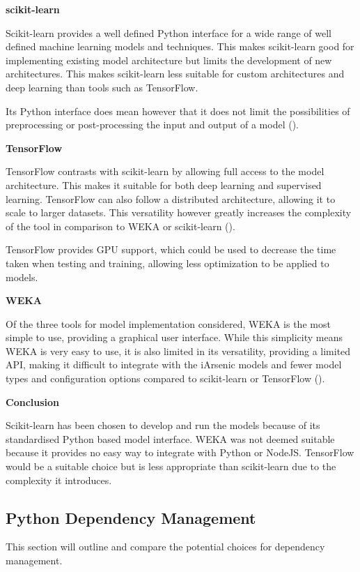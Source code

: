 \textbf{scikit-learn}

Scikit-learn provides a well defined Python interface for a wide range of well defined machine learning models and techniques. This makes scikit-learn good for implementing existing model architecture but limits the development of new architectures. This makes scikit-learn less suitable for custom architectures and deep learning than tools such as TensorFlow. 

Its Python interface does mean however that it does not limit the possibilities of preprocessing or post-processing the input and output of a model (\cite{scikit-learn2023}).

\textbf{TensorFlow}

TensorFlow contrasts with scikit-learn by allowing full access to the model architecture. This makes it suitable for both deep learning and supervised learning. TensorFlow can also follow a distributed architecture, allowing it to scale to larger datasets. This versatility however greatly increases the complexity of the tool in comparison to WEKA or scikit-learn (\cite{Google2023}).

TensorFlow provides GPU support, which could be used to decrease the time taken when testing and training, allowing less optimization to be applied to models.

\textbf{WEKA}

Of the three tools for model implementation considered, WEKA is the most simple to use, providing a graphical user interface. While this simplicity means WEKA is very easy to use, it is also limited in its versatility, providing a limited API, making it difficult to integrate with the iArsenic models and fewer model types and configuration options compared to scikit-learn or TensorFlow (\cite{Waikato2023}).

\textbf{Conclusion}

Scikit-learn has been chosen to develop and run the models because of its standardised Python based model interface. WEKA was not deemed suitable because it provides no easy way to integrate with Python or NodeJS. TensorFlow would be a suitable choice but is less appropriate than scikit-learn due to the complexity it introduces.

\subsection{Python Dependency Management}

This section will outline and compare the potential choices for dependency management.

